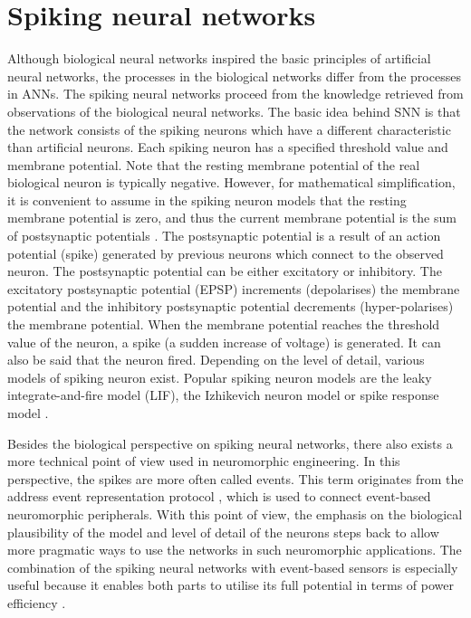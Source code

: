 \section{Spiking neural networks}
Although biological neural networks inspired the basic principles of artificial neural networks, the processes in the biological networks differ from the processes in ANNs. The spiking neural networks proceed from the knowledge retrieved from observations of the biological neural networks. The basic idea behind SNN is that the network consists of the spiking neurons which have a different characteristic than artificial neurons. Each spiking neuron has a specified threshold value and membrane potential. Note that the resting membrane potential of the real biological neuron is typically negative. However, for mathematical simplification, it is convenient to assume in the spiking neuron models that the resting membrane potential is zero, and thus the current membrane potential is the sum of postsynaptic potentials \cite{maassNetworksSpikingNeurons1997}. The postsynaptic potential is a result of an action potential (spike) generated by previous neurons which connect to the observed neuron. The postsynaptic potential can be either excitatory or inhibitory. The excitatory postsynaptic potential (EPSP) increments (depolarises) the membrane potential and the inhibitory postsynaptic potential decrements (hyper-polarises) the membrane potential. When the membrane potential reaches the threshold value of the neuron, a spike (a sudden increase of voltage) is generated. It can also be said that the neuron fired. Depending on the level of detail, various models of spiking neuron exist. Popular spiking neuron models are the leaky integrate-and-fire model (LIF), the Izhikevich neuron model or spike response model \cite{tavanaeiDeepLearningSpiking2019}. \par
Besides the biological perspective on spiking neural networks, there also exists a more technical point of view used in neuromorphic engineering. In this perspective, the spikes are more often called events. This term originates from the address event representation protocol \cite{pazTestInfrastructureAddressEventRepresentation2005, boahenPointtopointConnectivity00}, which is used to connect event-based neuromorphic peripherals. With this point of view, the emphasis on the biological plausibility of the model and level of detail of the neurons steps back to allow more pragmatic ways to use the networks in such neuromorphic applications. The combination of the spiking neural networks with event-based sensors is especially useful because it enables both parts to utilise its full potential in terms of power efficiency \cite{pfeifferDeepLearningSpiking2018}.

